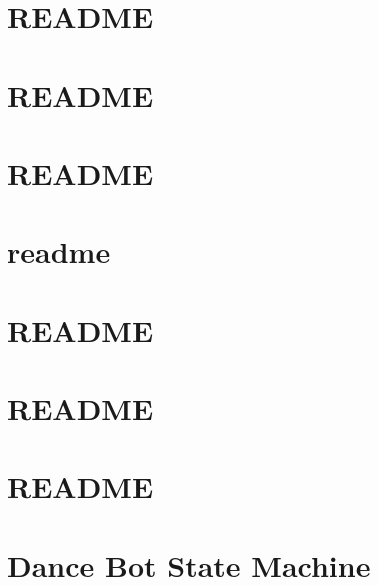 \documentclass[twoside]{book}
\newcommand{\+}{\discretionary{\mbox{\scriptsize$\hookleftarrow$}}{}{}}
\begin{document}
\chapter{R\+E\+A\+D\+ME}
\label{md_smacc_client_library_multirole_sensor_client_README}

\chapter{R\+E\+A\+D\+ME}
\label{md_smacc_client_library_ros_publisher_client_README}

\chapter{R\+E\+A\+D\+ME}
\label{md_smacc_client_library_ros_timer_client_README}

\chapter{readme}
\label{md_smacc_diagnostics_readme}

\chapter{R\+E\+A\+D\+ME}
\label{md_smacc_sm_reference_library_sm_atomic_README}

\chapter{R\+E\+A\+D\+ME}
\label{md_smacc_sm_reference_library_sm_atomic_cb_README}

\chapter{R\+E\+A\+D\+ME}
\label{md_smacc_sm_reference_library_sm_calendar_week_README}

\chapter{Dance Bot State Machine}
\label{md_smacc_sm_reference_library_sm_dance_bot_launch_readme}

\end{document}

